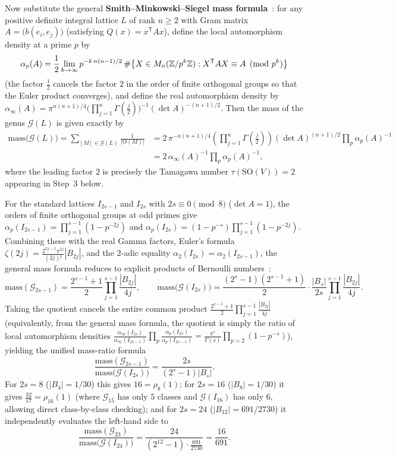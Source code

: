 Now substitute the general \textbf{Smith--Minkowski--Siegel mass formula}~\cite{Siegel1935,ConwaySloane1988,ConwaySloane1999}: for any positive definite integral lattice $L$ of rank $n\ge 2$ with Gram matrix $A=\bigl(b(e_i,e_j)\bigr)$ (satisfying $Q(x)=x^{\mathsf T}Ax$), define the local automorphism density at a prime $p$ by
\[
\alpha_p(A)=\frac{1}{2}\lim_{k\to\infty}p^{-k\,n(n-1)/2}\,\#\bigl\{X\in M_n(\mathbb{Z}/p^k\mathbb{Z}):X^{\mathsf T}AX\equiv A\pmod{p^k}\bigr\}
\]
(the factor $\frac{1}{2}$ cancels the factor $2$ in the order of finite orthogonal groups so that the Euler product converges), and define the real automorphism density by $\alpha_\infty(A)=\pi^{n(n+1)/4}\allowbreak\bigl(\prod_{j=1}^{n}\Gamma(\tfrac{j}{2})\bigr)^{-1}\allowbreak(\det A)^{-(n+1)/2}$. Then the mass of the genus $\mathcal G(L)$ is given exactly by
\[
\begin{aligned}
\mathrm{mass}\bigl(\mathcal G(L)\bigr)
=\sum_{[M]\in\mathcal G(L)}\frac{1}{|\mathrm O(M)|}
&=2\,\pi^{-n(n+1)/4}\left(\prod_{j=1}^{n}\Gamma\!\left(\frac{j}{2}\right)\right)(\det A)^{(n+1)/2}\prod_{p}\alpha_p(A)^{-1}\\
&=2\,\alpha_\infty(A)^{-1}\prod_{p}\alpha_p(A)^{-1},
\end{aligned}
\]
where the leading factor $2$ is precisely the Tamagawa number $\tau(\mathrm{SO}(V))=2$ appearing in Step~3 below.

For the standard lattices $I_{2s-1}$ and $I_{2s}$ with $2s\equiv 0\pmod 8$ ($\det A=1$), the orders of finite orthogonal groups at odd primes give $\alpha_p(I_{2s-1})=\prod_{j=1}^{s-1}(1-p^{-2j})$ and $\alpha_p(I_{2s})=(1-p^{-s})\prod_{j=1}^{s-1}(1-p^{-2j})$. Combining these with the real Gamma factors, Euler's formula $\zeta(2j)=\frac{2^{2j-1}\pi^{2j}}{(2j)!}|B_{2j}|$, and the $2$-adic equality $\alpha_2(I_{2s})=\alpha_2(I_{2s-1})$, the general mass formula reduces to explicit products of Bernoulli numbers~\cite{ConwaySloane1988,ConwaySloane1999}:
\[
\mathrm{mass}(\mathcal G_{2s-1})
=\frac{2^{s-1}+1}{2}\prod_{j=1}^{s-1}\frac{|B_{2j}|}{4j},
\qquad
\mathrm{mass}\bigl(\mathcal G(I_{2s})\bigr)
=\frac{(2^s-1)(2^{s-1}+1)}{2}\cdot\frac{|B_s|}{2s}\prod_{j=1}^{s-1}\frac{|B_{2j}|}{4j}.
\]
Taking the quotient cancels the entire common product $\frac{2^{s-1}+1}{2}\prod_{j=1}^{s-1}\frac{|B_{2j}|}{4j}$ (equivalently, from the general mass formula, the quotient is simply the ratio of local automorphism densities $\frac{\alpha_\infty(I_{2s})}{\alpha_\infty(I_{2s-1})}\prod_p\frac{\alpha_p(I_{2s})}{\alpha_p(I_{2s-1})}=\frac{\pi^s}{\Gamma(s)}\prod_{p>2}(1-p^{-s})$), yielding the unified mass-ratio formula
\[
\frac{\mathrm{mass}(\mathcal G_{2s-1})}{\mathrm{mass}\bigl(\mathcal G(I_{2s})\bigr)}
=\frac{2s}{(2^s-1)|B_s|}.
\]
For $2s=8$ ($|B_4|=1/30$) this gives $16=\rho_8(1)$; for $2s=16$ ($|B_8|=1/30$) it gives $\frac{32}{17}=\rho_{16}(1)$ (where $\mathcal G_{15}$ has only $5$ classes and $\mathcal G(I_{16})$ has only $6$, allowing direct class-by-class checking); and for $2s=24$ ($|B_{12}|=691/2730$) it independently evaluates the left-hand side to
\[
\frac{\mathrm{mass}(\mathcal G_{23})}{\mathrm{mass}\bigl(\mathcal G(I_{24})\bigr)}
=\frac{24}{(2^{12}-1)\cdot\frac{691}{2730}}
=\frac{16}{691}.
\]


